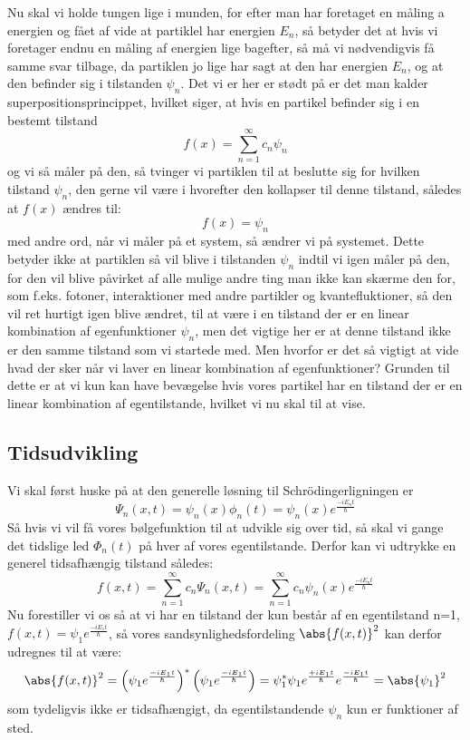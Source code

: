 Nu skal vi holde tungen lige i munden, for efter man har foretaget en måling a energien og fået af vide at partiklel har energien $E_n$, så betyder det at hvis vi foretager endnu en måling af energien lige bagefter, så må vi nødvendigvis få samme svar tilbage, da partiklen jo lige har sagt at den har energien $E_n$, og at den befinder sig i tilstanden $\psi_n$.
Det vi er her er stødt på er det man kalder superpositionsprincippet, hvilket siger, at hvis en partikel befinder sig i en bestemt tilstand
\begin{equation*}
    f(x)=\sum_{n=1}^{\infty}c_n\psi_n
\end{equation*}
og vi så måler på den, så tvinger vi partiklen til at beslutte sig for hvilken tilstand $\psi_n$, den gerne vil være i hvorefter den kollapser til denne tilstand, således at $f(x)$ ændres til:
\begin{equation*}
    f(x)=\psi_n
\end{equation*}
med andre ord, når vi måler på et system, så ændrer vi på systemet. Dette betyder ikke at partiklen så vil blive i tilstanden $\psi_n$ indtil vi igen måler på den, for den vil blive påvirket af alle mulige andre ting man ikke kan skærme den for, som f.eks. fotoner, interaktioner med andre partikler og kvantefluktioner, så den vil ret hurtigt igen blive ændret, til at være i en tilstand der er en linear kombination af egenfunktioner $\psi_n$, men det vigtige her er at denne tilstand ikke er den samme tilstand som vi startede med. 
Men hvorfor er det så vigtigt at vide hvad der sker når vi laver en linear kombination af egenfunktioner? Grunden til dette er at vi kun kan have bevægelse hvis vores partikel har en tilstand der er en linear kombination af egentilstande, hvilket vi nu skal til at vise.
\subsection{Tidsudvikling}
Vi skal først huske på at den generelle løsning til Schrödingerligningen er
$$\Psi_n(x,t)=\psi_n(x)\phi_n(t)=\psi_n(x)e^{\frac{-iE_nt}{\hbar}}$$
Så hvis vi vil få vores bølgefunktion til at udvikle sig over tid, så skal vi gange det tidslige led $\Phi_n(t)$ på hver af vores egentilstande. Derfor kan vi udtrykke en generel tidsafhængig tilstand således:
\begin{equation}
    f(x,t)=\sum_{n=1}^{\infty}c_n\Psi_n(x,t)=\sum_{n=1}^{\infty}c_n\psi_n(x)e^{\frac{-iE_nt}{\hbar}}
\end{equation}
Nu forestiller vi os så at vi har en tilstand der kun består af en egentilstand n=1, $f(x,t)=\psi_1e^{\frac{-iE_1t}{\hbar}}$, så vores sandsynlighedsfordeling $\abs{f(x,t)}^2$ kan derfor udregnes til at være:
\begin{equation*}
    \abs{f(x,t)}^2=\left(\psi_1e^{\frac{-iE_1t}{\hbar}}\right)^{*}\left(\psi_1e^{\frac{-iE_1t}{\hbar}}\right)=\psi_1^{*}\psi_1 e^{\frac{+iE_1t}{\hbar}}e^{\frac{-iE_1t}{\hbar}}=\abs{\psi_1}^{2}
\end{equation*}
som tydeligvis ikke er tidsafhængigt, da egentilstandende $\psi_n$ kun er funktioner af sted.

